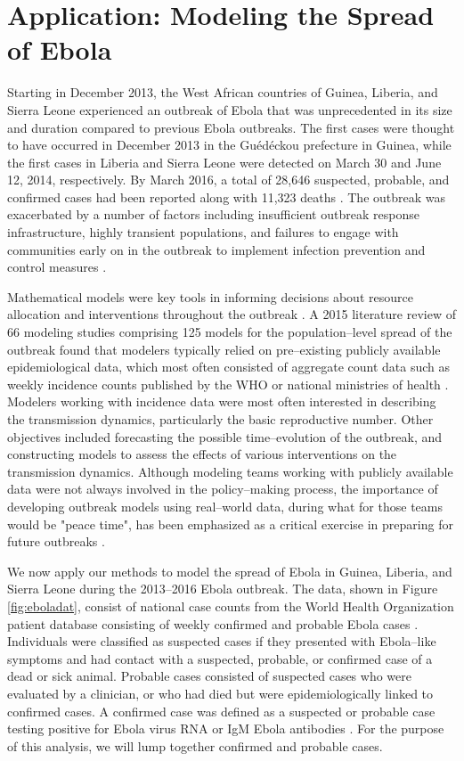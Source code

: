\section{Application: Modeling the Spread of Ebola}
\label{sec:lna_ebola}
Starting in December 2013, the West African countries of Guinea, Liberia, and Sierra Leone experienced an outbreak of Ebola that was unprecedented in its size and duration compared to previous Ebola outbreaks. The first cases were thought to have occurred in December 2013 in the Gu\'{e}d\'{e}ckou prefecture in Guinea, while the first cases in Liberia and Sierra Leone were detected on March 30 and June 12, 2014, respectively. By March 2016, a total of 28,646 suspected, probable, and confirmed cases had been reported along with 11,323 deaths \cite{who2016situation}. The outbreak was exacerbated by a number of factors including insufficient outbreak response infrastructure, highly transient populations, and failures to engage with communities early on in the outbreak to implement infection prevention and control measures \cite{coltart2017ebola,dudas2017virus}. 

Mathematical models were key tools in informing decisions about resource allocation and interventions throughout the outbreak \cite{coltart2017ebola}. A 2015 literature review of 66 modeling studies comprising 125 models for the population--level spread of the outbreak found that modelers typically relied on pre--existing publicly available epidemiological data, which most often consisted of aggregate count data such as weekly incidence counts published by the WHO or national ministries of health \cite{chretien2015mathematical}. Modelers working with incidence data were most often interested in describing the transmission dynamics, particularly the basic reproductive number. Other objectives included forecasting the possible time--evolution of the outbreak, and constructing models to assess the effects of various interventions on the transmission dynamics. Although modeling teams working with publicly available data were not always involved in the policy--making process, the importance of developing outbreak models using real--world data, during what for those teams would be "peace time", has been emphasized as a critical exercise in preparing for future outbreaks \cite{viboud2018rapidd}.

We now apply our methods to model the spread of Ebola in Guinea, Liberia, and Sierra Leone during the 2013--2016 Ebola outbreak. The data, shown in Figure \ref{fig:eboladat}, consist of national case counts from the World Health Organization patient database consisting of weekly confirmed and probable Ebola cases \cite{who2016eboladat}. Individuals were classified as suspected cases if they presented with Ebola--like symptoms and had contact with a suspected, probable, or confirmed case of a dead or sick animal. Probable cases consisted of suspected cases who were evaluated by a clinician, or who had died but were epidemiologically linked to confirmed cases. A confirmed case was defined as a suspected or probable case testing positive for Ebola virus RNA or IgM Ebola antibodies \cite{coltart2017ebola}. For the purpose of this analysis, we will lump together confirmed and probable cases.

